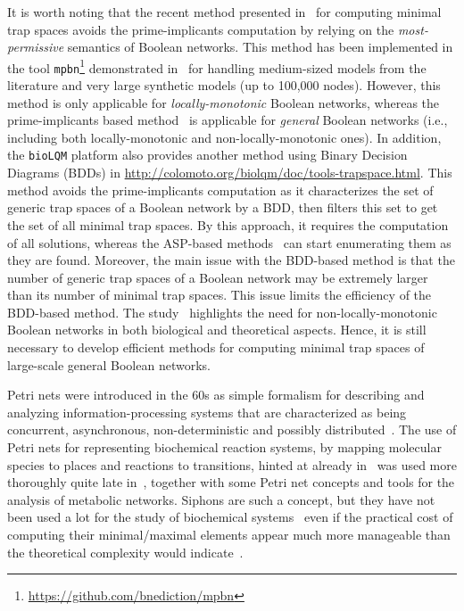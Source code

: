 \documentclass[preprint,12pt]{elsarticle}
\begin{document}
It is worth noting that the recent method presented in~\cite{DBLP:conf/ictai/ChevalierFPZ19} for computing minimal trap spaces avoids the prime-implicants computation by relying on the \emph{most-permissive} semantics of Boolean networks.
This method has been implemented in the tool \texttt{mpbn}\footnote{\url{https://github.com/bnediction/mpbn}} demonstrated in~\cite{Paulev2020} for handling medium-sized models from the literature and very large synthetic models (up to 100,000 nodes).
However, this method is only applicable for \emph{locally-monotonic} Boolean networks, whereas the prime-implicants based method~\cite{klarner2015computing} is applicable for \emph{general} Boolean networks (i.e., including both locally-monotonic and non-locally-monotonic ones).
In addition, the \texttt{bioLQM} platform also provides another method using Binary Decision Diagrams (BDDs) in \url{http://colomoto.org/biolqm/doc/tools-trapspace.html}.
This method avoids the prime-implicants computation as it characterizes the set of generic trap spaces of a Boolean network by a BDD, then filters this set to get the set of all minimal trap spaces.
By this approach, it requires the computation of all solutions, whereas the ASP-based methods~\cite{klarner2015computing,Paulev2020} can start enumerating them as they are found.
Moreover, the main issue with the BDD-based method is that the number of generic trap spaces of a Boolean network may be extremely larger than its number of minimal trap spaces.
This issue limits the efficiency of the BDD-based method.
The study~\cite{DBLP:journals/tcs/NoualRS13} highlights the need for non-locally-monotonic Boolean networks in both biological and theoretical aspects.
Hence, it is still necessary to develop efficient methods for computing minimal trap spaces of large-scale general Boolean networks.

Petri nets were introduced in the 60s as simple formalism for describing and analyzing information-processing systems that are characterized as being concurrent, asynchronous, non-deterministic and possibly distributed~\cite{peterson1981petri,Murata1989}.
The use of Petri nets for representing biochemical reaction systems, by mapping molecular species to places and reactions to transitions, hinted at already in~\cite{peterson1981petri,Murata1989} was used more thoroughly quite late in~\cite{reddy1993petri}, together with some Petri net concepts and tools for the analysis of metabolic networks.
Siphons are such a concept, but they have not been used a lot for the study of biochemical systems~\cite{zevedei2003topological,blatke2015biomodel} even if the practical cost of computing their minimal/maximal elements appear much more manageable than the theoretical complexity would indicate~\cite{oanea2010new,nabli2016enumerating}.
\end{document}
